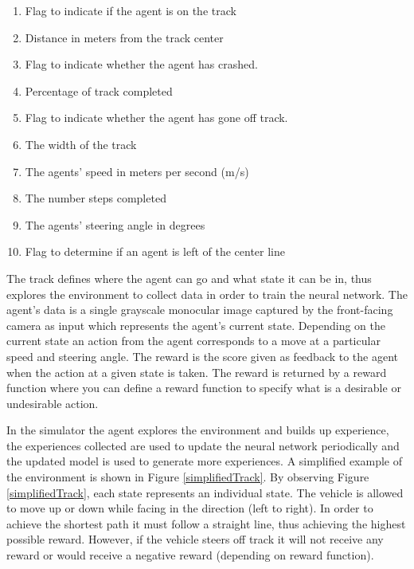 \documentclass[journal]{IEEEtran}
\begin{document}
\begin{enumerate}
  \item Flag to indicate if the agent is on the track
  \item Distance in meters from the track center
  \item Flag to indicate whether the agent has crashed.
  \item Percentage of track completed
  \item Flag to indicate whether the agent has gone off track.
  \item The width of the track
  \item The agents’ speed in meters per second (m/s)
  \item The number steps completed
  \item The agents’ steering angle in degrees
  \item Flag to determine if an agent is left of the center line
\end{enumerate}

The track defines where the agent can go and what state it can be in, thus explores the environment to collect data in order to train the neural network. The agent's data is a single grayscale monocular image captured by the front-facing camera as input which represents the agent's current state. Depending on the current state an action from the agent corresponds to a move at a particular speed and steering angle. The reward is the score given as feedback to the agent when the action at a given state is taken.  The reward is returned by a reward function where you can define a reward function to specify what is a desirable or undesirable action.

In the simulator the agent explores the environment and builds up experience, the experiences collected are used to update the neural network periodically and the updated model is used to generate more experiences.   A simplified example of the environment is shown in Figure \ref{simplifiedTrack}.  By observing Figure \ref{simplifiedTrack}, each state represents an individual state. The vehicle is allowed to move up or down while facing in the direction (left to right). In order to achieve the shortest path it must follow a straight line, thus achieving the highest possible reward.  However, if the vehicle steers off track it will not receive any reward or would receive a negative reward (depending on reward function).
\end{document}
